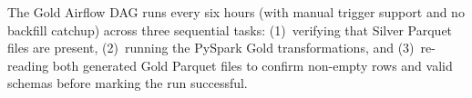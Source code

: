 The Gold Airflow DAG runs every six hours (with manual trigger support and no backfill catchup) across three sequential tasks: (1)~verifying that Silver Parquet files are present, (2)~running the PySpark Gold transformations, and (3)~re-reading both generated Gold Parquet files to confirm non-empty rows and valid schemas before marking the run successful.
